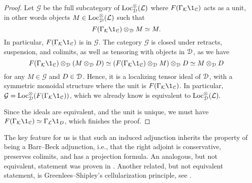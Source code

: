\begin{proof}
    Let $\mathcal{G}$ be the full subcategory of $\operatorname{Loc}_{\EuScript{D}}^\otimes(\mathcal{L})$ where $F(\Gamma_\K\1_\C)$ acts as a unit, in other words objects $M\in \operatorname{Loc}_{\EuScript{D}}^\otimes(\mathcal{L})$ such that 
    \[F(\Gamma_\K\1_\C)\otimes_{\D} M\simeq M.\] 
    In particular, $F(\Gamma_\K\1_\C)$ is in $\mathcal{G}$. The category $\mathcal{G}$ is closed under retracts, suspension, and colimits, as well as tensoring with objects in $\EuScript{D}$, as we have 
    \[F(\Gamma_\K\1_\C) \otimes_\D (M\otimes_\D D)\simeq (F(\Gamma_\K\1_\C)\otimes_\D M) \otimes_\D D \simeq M\otimes_\D D\]
    for any $M\in \mathcal{G}$ and $D\in \EuScript{D}$. Hence, it is a localizing tensor ideal of $\EuScript{D}$, with a symmetric monoidal structure where the unit is $F(\Gamma_\K\1_\C)$. In particular, $\mathcal{G} = \Loc_\D^\otimes(F(\Gamma_\K\1_\C))$, which we already know is equivalent to $\operatorname{Loc}_{\EuScript{D}}^\otimes(\mathcal{L}).$
    
    Since the ideals are equivalent, and the unit is unique, we must have $F(\Gamma_\K\1_\C)\simeq \Gamma_\L \1_D$, which finishes the proof. 
\end{proof}

The key feature for us is that such an induced adjunction inherits the property of being a Barr--Beck adjunction, i.e., that the right adjoint is conservative, preserves colimits, and has a projection formula. An analogous, but not equivalent, statement was proven in \cite[4.5]{behrens-shaw_2020}. Another related, but not equivalent statement, is Greenlees--Shipley's cellularization principle, see \cite{greenlees-shipley_2013}. 

